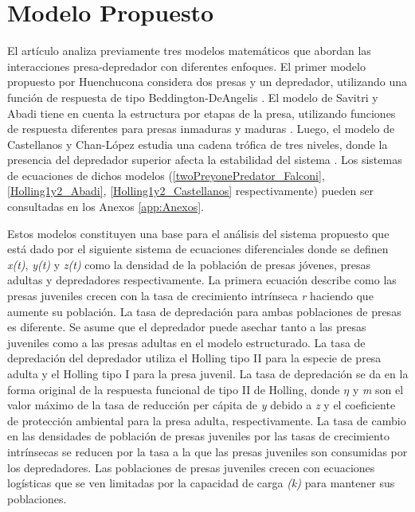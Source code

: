 \documentclass{wscpaperproc}
\theoremstyle{wsc}
\begin{document}
\section{Modelo Propuesto}

El artículo analiza previamente tres modelos matemáticos que abordan las interacciones presa-depredador con diferentes enfoques. El
primer modelo propuesto por Huenchucona considera dos presas y un depredador, utilizando una
función de respuesta de tipo Beddington-DeAngelis \cite{falconi_stability_2015}. El modelo de Savitri y Abadi tiene en cuenta la estructura
por etapas de la presa, utilizando funciones de respuesta diferentes para presas inmaduras y maduras \cite{savitri_dynamics_2018}. Luego, el
modelo de Castellanos y Chan-López estudia una cadena trófica de tres niveles, donde la presencia del depredador
superior afecta la estabilidad del sistema \cite{castellanos_existence_2017}. Los sistemas de ecuaciones de dichos modelos (\ref{twoPreyonePredator_Falconi}, \ref{Holling1y2_Abadi},
\ref{Holling1y2_Castellanos} respectivamente) pueden ser consultadas en los Anexos \ref{app:Anexos}.\par

Estos modelos constituyen una base para el análisis
del sistema propuesto que está dado por el siguiente sistema de ecuaciones diferenciales donde se definen \emph{x(t)}, \emph{y(t)} y \emph{z(t)} como la
densidad de la poblaci\'on de presas j\'ovenes, presas adultas y depredadores respectivamente.
La primera ecuación describe como las presas juveniles crecen con la tasa de crecimiento intrínseca \emph{r} haciendo que aumente su población. La tasa de depredación para ambas 
poblaciones de presas es diferente. Se asume que el depredador puede asechar tanto a las presas juveniles como a las presas adultas en el modelo estructurado. 
La tasa de depredación del depredador utiliza el Holling tipo II
para la especie de presa adulta y el Holling tipo I para la presa juvenil. La tasa de depredación se da en la forma original de la respuesta funcional
de tipo II de Holling, donde $\eta$  y \emph{m} son el valor máximo de la tasa de reducción per cápita de \emph{y} debido a \emph{z} y el coeficiente
de protección ambiental para la presa adulta, respectivamente. La tasa de cambio en las densidades de población de presas juveniles por las tasas de crecimiento intrínsecas se
reducen por la tasa a la que las presas juveniles son consumidas por los depredadores. Las poblaciones de presas juveniles crecen con ecuaciones logísticas
que se ven limitadas por la capacidad de carga \emph{(k)} para mantener sus poblaciones.\par
\end{document}
